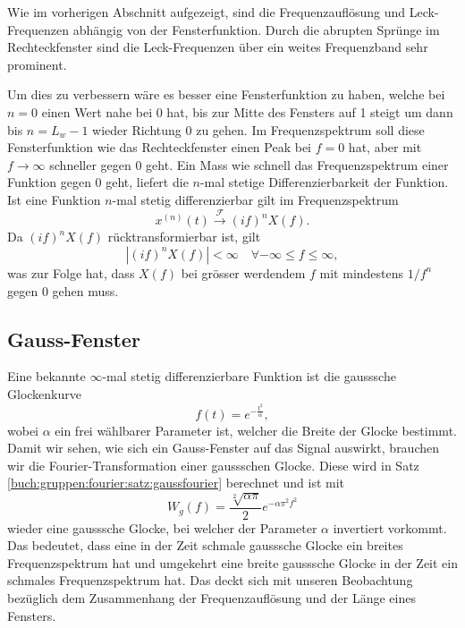 Wie im vorherigen Abschnitt aufgezeigt, sind die Frequenzauflösung und 
Leck-Frequenzen abhängig von der Fensterfunktion.
Durch die abrupten Sprünge im Rechteckfenster sind die Leck-Frequenzen 
über ein weites Frequenzband sehr prominent.

Um dies zu verbessern wäre es besser eine Fensterfunktion zu haben,
welche bei $n = 0$ einen Wert nahe bei 0 hat,
bis zur Mitte des Fensters auf 1 steigt um dann bis $n = L_w -1$ wieder Richtung 0 zu gehen. 
Im Frequenzspektrum soll diese Fensterfunktion wie das Rechteckfenster einen 
Peak bei $f = 0$ hat, aber mit $f \rightarrow \infty$ schneller
gegen 0 geht.
Ein Mass wie schnell das Frequenzspektrum einer Funktion gegen 0 geht, liefert
die $n$-mal stetige Differenzierbarkeit der Funktion.
Ist eine Funktion $n$-mal stetig differenzierbar gilt im Frequenzspektrum
\begin{equation}
    x^{(n)}(t) \xrightarrow{\mathscr{F}} (i f)^n X(f).
\end{equation}
Da $(i f)^n X(f)$ rücktransformierbar ist, gilt
\begin{equation}
    |(i f)^n X(f)| < \infty \quad \forall -\infty \leq f \leq \infty,
\end{equation}
was zur Folge hat, dass $X(f)$ bei grösser werdendem $f$ mit mindestens $1/f^n$ gegen 
0 gehen muss.

\subsection{Gauss-Fenster}
Eine bekannte $\infty$-mal stetig differenzierbare Funktion ist die gausssche Glockenkurve
\begin{equation}
    f(t) = e^{-\frac{t^2}{\alpha}},
\end{equation}
wobei $\alpha$ ein frei wählbarer Parameter ist, welcher die Breite der Glocke 
bestimmt.
Damit wir sehen, wie sich ein Gauss-Fenster auf das Signal auswirkt, brauchen wir
die Fourier-Transformation einer gaussschen Glocke.
Diese wird in Satz \ref{buch:gruppen:fourier:satz:gaussfourier} berechnet und ist mit
\begin{equation}
    W_g(f) =
    \frac{\sqrt[2]{\alpha \pi}}{2} e^{-\alpha \pi^2 f^2}
\end{equation}
wieder eine gausssche Glocke, bei welcher der Parameter $\alpha$ invertiert vorkommt.
Das bedeutet, dass eine in der Zeit schmale gausssche Glocke ein breites Frequenzspektrum hat und umgekehrt eine
breite gausssche Glocke in der Zeit ein schmales Frequenzspektrum hat.
Das deckt sich mit unseren Beobachtung bezüglich dem Zusammenhang der 
Frequenzauflösung und der Länge eines Fensters.

